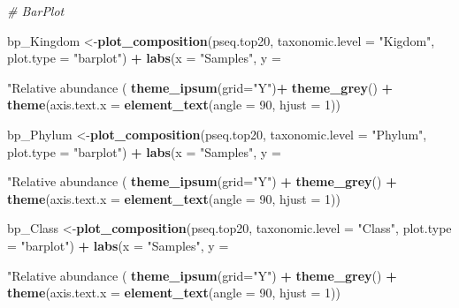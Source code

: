 \documentclass[]{article}
\newenvironment{Shaded}{\begin{snugshade}}{\end{snugshade}}
\newcommand{\CommentTok}[1]{\textcolor[rgb]{0.56,0.35,0.01}{\textit{#1}}}
\newcommand{\DataTypeTok}[1]{\textcolor[rgb]{0.13,0.29,0.53}{#1}}
\newcommand{\DecValTok}[1]{\textcolor[rgb]{0.00,0.00,0.81}{#1}}
\newcommand{\KeywordTok}[1]{\textcolor[rgb]{0.13,0.29,0.53}{\textbf{#1}}}
\newcommand{\NormalTok}[1]{#1}
\newcommand{\OperatorTok}[1]{\textcolor[rgb]{0.81,0.36,0.00}{\textbf{#1}}}
\newcommand{\StringTok}[1]{\textcolor[rgb]{0.31,0.60,0.02}{#1}}
\begin{document}
\begin{Shaded}
\begin{Highlighting}[]
\CommentTok{# BarPlot}

\NormalTok{bp_Kingdom <-}\KeywordTok{plot_composition}\NormalTok{(pseq.top20,}
                             \DataTypeTok{taxonomic.level =} \StringTok{"Kigdom"}\NormalTok{, }\DataTypeTok{plot.type =} \StringTok{"barplot"}\NormalTok{) }\OperatorTok{+}\StringTok{ }
\StringTok{  }\KeywordTok{labs}\NormalTok{(}\DataTypeTok{x =} \StringTok{"Samples"}\NormalTok{, }\DataTypeTok{y =} \StringTok{"Relative abundance (%)"}\NormalTok{, }\DataTypeTok{title =} \StringTok{"Relative abundance data"}\NormalTok{, }\DataTypeTok{subtitle =} \StringTok{"Kingdom"}\NormalTok{) }\OperatorTok{+}\StringTok{ }
\StringTok{  }\KeywordTok{theme_ipsum}\NormalTok{(}\DataTypeTok{grid=}\StringTok{"Y"}\NormalTok{)}\OperatorTok{+}\StringTok{ }\KeywordTok{theme_grey}\NormalTok{() }\OperatorTok{+}\StringTok{ }\KeywordTok{theme}\NormalTok{(}\DataTypeTok{axis.text.x =} \KeywordTok{element_text}\NormalTok{(}\DataTypeTok{angle =} \DecValTok{90}\NormalTok{, }\DataTypeTok{hjust =} \DecValTok{1}\NormalTok{))}


\NormalTok{bp_Phylum <-}\KeywordTok{plot_composition}\NormalTok{(pseq.top20,}
                             \DataTypeTok{taxonomic.level =} \StringTok{"Phylum"}\NormalTok{, }\DataTypeTok{plot.type =} \StringTok{"barplot"}\NormalTok{) }\OperatorTok{+}
\StringTok{  }\KeywordTok{labs}\NormalTok{(}\DataTypeTok{x =} \StringTok{"Samples"}\NormalTok{, }\DataTypeTok{y =} \StringTok{"Relative abundance (%)"}\NormalTok{, }\DataTypeTok{title =} \StringTok{"Relative abundance data"}\NormalTok{, }\DataTypeTok{subtitle =} \StringTok{"Phylum"}\NormalTok{) }\OperatorTok{+}\StringTok{ }
\StringTok{  }\KeywordTok{theme_ipsum}\NormalTok{(}\DataTypeTok{grid=}\StringTok{"Y"}\NormalTok{) }\OperatorTok{+}\StringTok{ }\KeywordTok{theme_grey}\NormalTok{() }\OperatorTok{+}\StringTok{ }\KeywordTok{theme}\NormalTok{(}\DataTypeTok{axis.text.x =} \KeywordTok{element_text}\NormalTok{(}\DataTypeTok{angle =} \DecValTok{90}\NormalTok{, }\DataTypeTok{hjust =} \DecValTok{1}\NormalTok{))}


\NormalTok{bp_Class <-}\KeywordTok{plot_composition}\NormalTok{(pseq.top20,}
                             \DataTypeTok{taxonomic.level =} \StringTok{"Class"}\NormalTok{, }\DataTypeTok{plot.type =} \StringTok{"barplot"}\NormalTok{) }\OperatorTok{+}
\StringTok{  }\KeywordTok{labs}\NormalTok{(}\DataTypeTok{x =} \StringTok{"Samples"}\NormalTok{, }\DataTypeTok{y =} \StringTok{"Relative abundance (%)"}\NormalTok{, }\DataTypeTok{title =} \StringTok{"Relative abundance data"}\NormalTok{, }\DataTypeTok{subtitle =} \StringTok{"Class"}\NormalTok{) }\OperatorTok{+}\StringTok{ }
\StringTok{  }\KeywordTok{theme_ipsum}\NormalTok{(}\DataTypeTok{grid=}\StringTok{"Y"}\NormalTok{) }\OperatorTok{+}\StringTok{ }\KeywordTok{theme_grey}\NormalTok{() }\OperatorTok{+}\StringTok{ }\KeywordTok{theme}\NormalTok{(}\DataTypeTok{axis.text.x =} \KeywordTok{element_text}\NormalTok{(}\DataTypeTok{angle =} \DecValTok{90}\NormalTok{, }\DataTypeTok{hjust =} \DecValTok{1}\NormalTok{))}

}}}
\end{Highlighting}
\end{Shaded}
\end{document}
